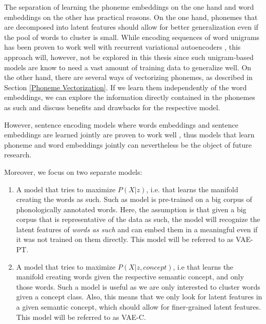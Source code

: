 \documentclass[6pt]{article}
\begin{document}
The separation of learning the phoneme embeddings on the one hand and word embeddings on the other has practical reasons. On the one hand, phonemes that are decomposed into latent features should allow for better generalization even if the pool of words to cluster is small. While encoding sequences of word unigrams has been proven to work well with recurrent variational autoencoders \citep{bowman2015generating}, this approach will, however, not be explored in this thesis since such unigram-based models are know to need a vast amount of training data to generalize well. On the other hand, there are several ways of vectorizing phonemes, as described in Section \ref{Phoneme Vectorization}. If we learn them independently of the word embeddings, we can explore the information directly contained in the phonemes as such and discuss benefits and drawbacks for the respective model.

However, sentence encoding models where words embeddings and sentence embeddings are learned jointly are proven to work well \cite{kiros2015skip}, thus models that learn phoneme and word embeddings jointly can nevertheless be the object of future research.


Moreover, we focus on two separate models:
\begin{enumerate}
\item A model that tries to maximize $P(X|z)$, i.e. that learns the manifold creating the words as such. Such as model is pre-trained on a big corpus of phonologically annotated words. Here, the assumption is that given a big corpus that is representative of the data as such, the model will recognize the latent features of \textit{words as such} and can embed them in a meaningful even if it was not trained on them directly. This model will be referred to as VAE-PT.
\item A model that tries to maximize $P(X|z,concept)$, i.e that learns the manifold creating words given the respective semantic concept, and only those words. Such a model is useful as we are only interested to cluster words given a concept class. Also, this means that we only look for latent features in a given semantic concept, which should allow for finer-grained latent features. This model will be referred to as VAE-C.
\end{enumerate}
\end{document}
